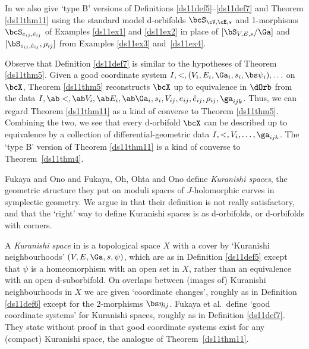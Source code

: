 \documentclass{article}
\begin{document}
In \cite[\S 10.8]{Joyc6} we also give `type B' versions of
Definitions \ref{ds11def5}--\ref{ds11def7} and Theorem
\ref{ds11thm11} using the standard model d-orbifolds
$\bcS_{\cV,\cE,s}$ and 1-morphisms $\bcS_{\smash{e_{ij},\hat
e_{ij}}}$ of Examples \ref{ds11ex1} and \ref{ds11ex2} in place of
$[\bS_{V,E,s}/\Ga]$ and $[\bS_{\smash{e_{ij},\hat
e_{ij}}},\rho_{ij}]$ from Examples \ref{ds11ex3} and~\ref{ds11ex4}.

Observe that Definition \ref{ds11def7} is similar to the hypotheses
of Theorem \ref{ds11thm5}. Given a good coordinate system
$I,<,(V_i,E_i,\Ga_i,s_i,\bs\psi_i),\ldots$ on $\bcX$, Theorem
\ref{ds11thm5} reconstructs $\bcX$ up to equivalence in $\dOrb$ from
the data $I,\ab <,\ab V_i,\ab E_i,\ab\Ga_i,s_i,V_{ij},e_{ij},\hat
e_{ij},\rho_{ij}, \ga_{ijk}$. Thus, we can regard Theorem
\ref{ds11thm11} as a kind of converse to Theorem \ref{ds11thm5}.
Combining the two, we see that every d-orbifold $\bcX$ can be
described up to equivalence by a collection of
differential-geometric data $I,<,V_i,\ldots, \ga_{ijk}$. The `type
B' version of Theorem \ref{ds11thm11} is a kind of converse to
Theorem~\ref{ds11thm4}.

Fukaya and Ono \cite[\S 5]{FuOn} and Fukaya, Oh, Ohta and Ono
\cite[\S A1]{FOOO} define {\it Kuranishi spaces}, the geometric structure they put on moduli spaces of
$J$-holomorphic curves in symplectic geometry. We argue in \cite[\S 14.3]{Joyc6} that their definition is
not really satisfactory, and that the `right' way to define
Kuranishi spaces is as d-orbifolds, or d-orbifolds with corners.

A {\it Kuranishi space\/} in \cite[\S A1]{FOOO} is a topological
space $X$ with a cover by `Kuranishi neighbourhoods'
$(V,E,\Ga,s,\psi)$, which are as in Definition \ref{ds11def5} except
that $\psi$ is a homeomorphism with an open set in $X$, rather than
an equivalence with an open d-suborbifold. On overlaps between
(images of) Kuranishi neighbourhoods in $X$ we are given `coordinate
changes', roughly as in Definition \ref{ds11def6} except for the
2-morphisms $\bs\eta_{ij}$. Fukaya et al.\ define `good coordinate
systems' for Kuranishi spaces, roughly as in Definition
\ref{ds11def7}. They state without proof in \cite[Lem.~A1.11]{FOOO}
that good coordinate systems exist for any (compact) Kuranishi
space, the analogue of Theorem~\ref{ds11thm11}.
\end{document}
